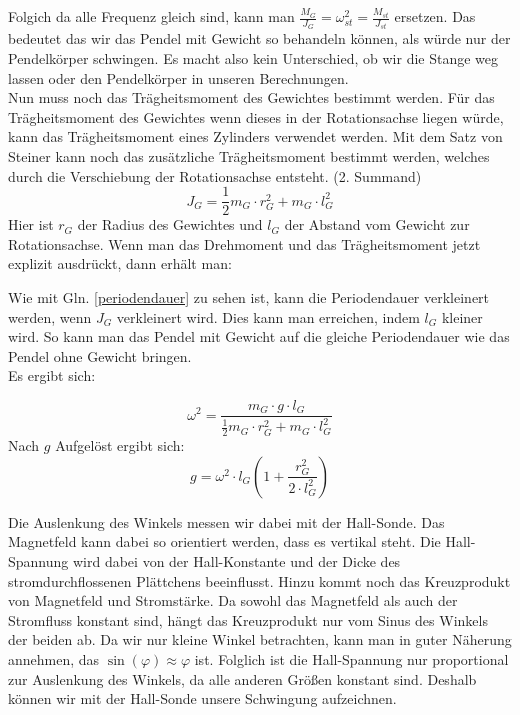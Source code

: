 \documentclass[twoside]{protokoll}
\begin{document}
Folgich da alle Frequenz gleich sind, kann man $\frac{M_G}{J_G} = \omega_{st}^2 = \frac{M_{st}}{J_{st}}$ ersetzen.
Das bedeutet das wir das Pendel mit Gewicht so behandeln können, als würde nur der Pendelkörper schwingen. 
Es macht also kein Unterschied, ob wir die Stange weg lassen oder den Pendelkörper in unseren Berechnungen. \\
Nun muss noch das Trägheitsmoment des Gewichtes bestimmt werden.
Für das Trägheitsmoment des Gewichtes wenn dieses in der Rotationsachse liegen würde, kann das Trägheitsmoment eines Zylinders verwendet werden.
Mit dem Satz von Steiner kann noch das zusätzliche Trägheitsmoment bestimmt werden, welches durch die Verschiebung der Rotationsachse entsteht. (2. Summand)
\begin{equation}
    J_G = \frac{1}{2} m_G \cdot r_G^2 + m_G \cdot l_G^2
\end{equation}
Hier ist $r_G$ der Radius des Gewichtes und $l_G$ der Abstand vom Gewicht zur Rotationsachse.
Wenn man das Drehmoment und das Trägheitsmoment jetzt explizit ausdrückt, dann erhält man:
 
Wie mit Gln. \ref{periodendauer} zu sehen ist, kann die Periodendauer verkleinert werden, wenn $J_G$ verkleinert wird.
Dies kann man erreichen, indem $l_G$ kleiner wird. So kann man das Pendel mit Gewicht auf die gleiche Periodendauer wie das Pendel ohne Gewicht bringen. \\

Es ergibt sich:
 
\begin{equation}
    \omega^2 = \frac{m_G \cdot g \cdot l_G}{\frac{1}{2} m_G \cdot r_G^2 + m_G \cdot l_G^2}
\end{equation}
Nach $g$ Aufgelöst ergibt sich:
\begin{equation}
    g = \omega^2 \cdot l_G \left( 1 + \frac{r_G^2}{2 \cdot l_G^2} \right)
    \label{eq:pendel_g}
\end{equation}


Die Auslenkung des Winkels messen wir dabei mit der Hall-Sonde.
Das Magnetfeld kann dabei so orientiert werden, dass es vertikal steht.
Die Hall-Spannung wird dabei von der Hall-Konstante und  der Dicke des stromdurchflossenen Plättchens beeinflusst.
Hinzu kommt noch das Kreuzprodukt von Magnetfeld und Stromstärke. Da sowohl das Magnetfeld als auch der Stromfluss konstant sind, hängt das Kreuzprodukt nur vom Sinus des Winkels der beiden ab.
Da wir nur kleine Winkel betrachten, kann man in guter Näherung annehmen, das $\sin(\varphi) \approx \varphi$ ist.
Folglich ist die Hall-Spannung nur proportional zur Auslenkung des Winkels, da alle anderen Größen konstant sind.
Deshalb können wir mit der Hall-Sonde unsere Schwingung aufzeichnen.
\end{document}
